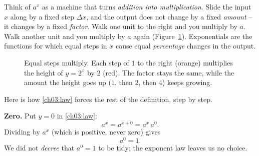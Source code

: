 \begin{intuitionbox}
Think of $a^x$ as a machine that turns \emph{addition into multiplication}. Slide the input $x$ along by a fixed step $\Delta x$, and the output does not change by a fixed \emph{amount} -- it changes by a fixed \emph{factor}. Walk one unit to the right and you multiply by $a$. Walk another unit and you multiply by $a$ again (Figure~\ref{ch03:fig-steps-multiply}). Exponentials are the functions for which equal steps in $x$ cause equal \emph{percentage} changes in the output.
\end{intuitionbox}

\begin{figure}[htbp]
\centering
{}
\caption{Equal steps multiply. Each step of $1$ to the right (orange) multiplies the height of $y=2^x$ by $2$ (red). The factor stays the same, while the amount the height goes up ($1$, then $2$, then $4$) keeps growing.}
\label{ch03:fig-steps-multiply}
\end{figure}

Here is how \eqref{ch03:law} forces the rest of the definition, step by step.

\textbf{Zero.} Put $y=0$ in \eqref{ch03:law}:
\[
a^x = a^{x+0} = a^x\, a^0.
\]
Dividing by $a^x$ (which is positive, never zero) gives
\[
a^0 = 1.
\]
We did not \emph{decree} that $a^0=1$ to be tidy; the exponent law leaves us no choice.

